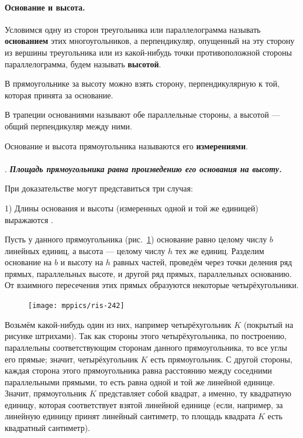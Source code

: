 \documentclass[twoside]{book}
\makeatletter
\newcommand{\rindex}[2][\imki@jobname]{%
  \index[#1]{\detokenize{#2}}%
}
\makeatother
\begin{document}
\paragraph{Основание и высота.}\label{1938/245}
Условимся одну из сторон треугольника или параллелограмма называть \rindex{основание}\textbf{основанием} этих многоугольников, а перпендикуляр, опущенный на эту сторону из вершины треугольника или из какой-нибудь точки противоположной стороны параллелограмма, будем называть \rindex{высота}\textbf{высотой}.

В прямоугольнике за высоту можно взять сторону, перпендикулярную к той, которая принята за основание.

В трапеции основаниями называют обе параллельные стороны, а высотой — общий перпендикуляр между ними.

Основание и высота прямоугольника называются его \rindex{измерения прямоугольника}\textbf{измерениями}.

\paragraph{}\label{1938/246}
.
\textbf{\emph{Площадь прямоугольника равна произведению его основания на высоту.}}

При доказательстве могут представиться три случая:


1) Длины основания и высоты (измеренных одной и той же единицей) выражаются .

Пусть у данного прямоугольника (рис.~\ref{1938/ris-242}) основание равно целому числу $b$ линейных единиц, а высота — целому числу $h$ тех же единиц.
Разделим основание на $b$ и высоту на $h$ равных частей, проведём через точки деления ряд прямых, параллельных высоте, и другой ряд прямых, параллельных основанию.
От взаимного пересечения этих прямых образуются некоторые четырёхугольники.

\begin{figure}
\centering
\texttt{[image: mppics/ris-242]}
\caption{}\label{1938/ris-242}
\end{figure}

Возьмём какой-нибудь один из них, например четырёхугольник $K$ (покрытый на рисунке штрихами).
Так как стороны этого четырёхугольника, по построению, параллельны соответствующим сторонам данного прямоугольника, то все углы его прямые;
значит, четырёхугольник $K$ есть прямоугольник.
С другой стороны, каждая сторона этого прямоугольника равна расстоянию между соседними параллельными прямыми, то есть равна одной и той же линейной единице. 
Значит, прямоугольник $K$ представляет собой квадрат, а именно, ту квадратную единицу, которая соответствует взятой линейной единице (если, например, за линейную единицу принят линейный сантиметр, то площадь квадрата $K$ есть квадратный сантиметр).
\end{document}
